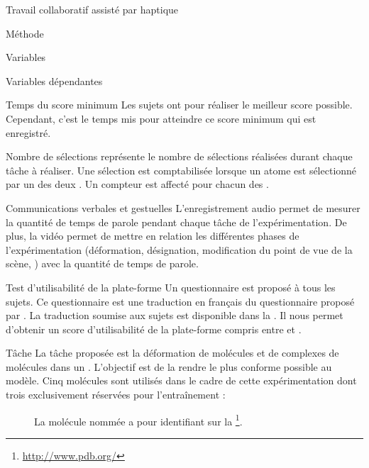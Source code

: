 \documentclass[myfrancais]{mythesis}
\begin{document}
\begin{mychapter}{Travail collaboratif assisté par haptique}
\begin{mysection}{Méthode}
\begin{mysubsection}{Variables}
\begin{mysubsubsection}{Variables dépendantes}
\begin{myparagraph}{ Temps du score  minimum}
						Les sujets ont  pour réaliser le meilleur score  possible.
						Cependant, c'est le temps mis pour atteindre ce score minimum qui est enregistré.
					\end{myparagraph}
					\begin{myparagraph}{ Nombre de sélections}
						 représente le nombre de sélections réalisées durant chaque tâche à réaliser.
						Une sélection est comptabilisée lorsque un atome est sélectionné par un des deux .
						Un compteur est affecté pour chacun des .
					\end{myparagraph}
					\begin{myparagraph}{ Communications verbales et gestuelles}
						L'enregistrement audio permet de mesurer la quantité de temps de parole pendant chaque tâche de l'expérimentation.
						De plus, la vidéo permet de mettre en relation les différentes phases de l'expérimentation (déformation, désignation, modification du point de vue de la scène, \myetc) avec la quantité de temps de parole.
					\end{myparagraph}
					\begin{myparagraph}{ Test d'utilisabilité de la plate-forme}
						Un questionnaire est proposé à tous les sujets.
						Ce questionnaire est une traduction en français du questionnaire  proposé par .
						La traduction soumise aux sujets est disponible dans la .
						Il nous permet d'obtenir un score d'utilisabilité de la plate-forme compris entre  et .
					\end{myparagraph}
				\end{mysubsubsection}
			\end{mysubsection}
			\begin{mysubsection}[sse-exp4-Tache]{Tâche}
				La tâche proposée est la déformation de molécules et de complexes de molécules dans un .
				L'objectif est de la rendre le plus conforme possible au modèle.
				Cinq molécules sont utilisés dans le cadre de cette expérimentation dont trois exclusivement réservées pour l'entraînement :
				\begin{description}
					\item[\myTRPCAGE]
						La molécule nommée \myTRPCAGE {} a pour identifiant \myPDB {} sur la \myPDBbase\footnote{\url{http://www.pdb.org/}}.

\end{description}
\end{mysubsection}
\end{mysection}
\end{mychapter}
\end{document}
